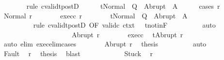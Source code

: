 \begin{isabellebody}
\ \ \ \ \ \ \isamarkupfalse%
\ {\isacharparenleft}rule\ cvalidt{\isacharunderscore}postD{\isacharparenright}\isanewline
\ \ \ \ \isamarkupfalse%
\ {\isachardoublequoteopen}t{\isasymin}Normal\ {\isacharbackquote}\ Q\ {\isasymunion}\ Abrupt\ {\isacharbackquote}\ A{\isachardoublequoteclose}\isanewline
\ \ \ \ \isamarkupfalse%
\ {\isacharparenleft}cases\ r{\isacharparenright}\isanewline
\ \ \ \ \ \ \isamarkupfalse%
\ {\isacharparenleft}Normal\ r{\isacharprime}{\isacharparenright}\isanewline
\ \ \ \ \ \ \isamarkupfalse%
\ exec{\isacharunderscore}c{}\ r\isanewline
\ \ \ \ \ \ \isamarkupfalse%
\ {\isachardoublequoteopen}t{\isasymin}Normal\ {\isacharbackquote}\ Q\ {\isasymunion}\ Abrupt\ {\isacharbackquote}\ A{\isachardoublequoteclose}\isanewline
\ \ \ \ \ \ \ \ \isamarkupfalse%
\ {\isacharminus}\isanewline
\ \ \ \ \ \ \ \ \isamarkupfalse%
\ {\isacharparenleft}rule\ cvalidt{\isacharunderscore}postD\ {\isacharbrackleft}OF\ valid{\isacharunderscore}c{}\ ctxt\ {\isacharunderscore}\ {\isacharunderscore}\ t{\isacharunderscore}notin{\isacharunderscore}F{\isacharbrackright}{\isacharparenright}\isanewline
\ \ \ \ \ \ \ \ \isamarkupfalse%
\ auto\isanewline
\ \ \ \ \ \ \ \ \isamarkupfalse%
\isanewline
\ \ \ \ \isamarkupfalse%
\isanewline
\ \ \ \ \ \ \isamarkupfalse%
\ {\isacharparenleft}Abrupt\ r{\isacharprime}{\isacharparenright}\isanewline
\ \ \ \ \ \ \isamarkupfalse%
\ exec{\isacharunderscore}c{}\ \isamarkupfalse%
\ {\isachardoublequoteopen}t{\isacharequal}Abrupt\ r{\isacharprime}{\isachardoublequoteclose}\isanewline
\ \ \ \ \ \ \ \ \isamarkupfalse%
\ {\isacharparenleft}auto\ elim{\isacharcolon}\ exec{\isacharunderscore}elim{\isacharunderscore}cases{\isacharparenright}\isanewline
\ \ \ \ \ \ \isamarkupfalse%
\ Abrupt\ r\ \isamarkupfalse%
\ {\isacharquery}thesis\isanewline
\ \ \ \ \ \ \ \ \isamarkupfalse%
\ auto\isanewline
\ \ \ \ \isamarkupfalse%
\isanewline
\ \ \ \ \ \ \isamarkupfalse%
\ Fault\ \isamarkupfalse%
\ r\ \isamarkupfalse%
\ {\isacharquery}thesis\ \isamarkupfalse%
\ blast\isanewline
\ \ \ \ \isamarkupfalse%
\isanewline
\ \ \ \ \ \ \isamarkupfalse%
\ Stuck\ \isamarkupfalse%
\ r\ \isamarkupfalse%

\end{isabellebody}
